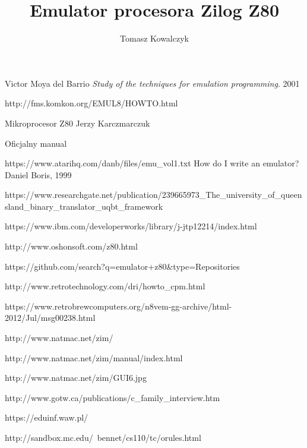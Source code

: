 \documentclass[12pt]{report}
\author{Tomasz Kowalczyk}
\title{Emulator procesora Zilog Z80}
\begin{document}
	\maketitle
	\tableofcontents
	
	
	
	
	
		
		
	
	
	
	
	
	
	
	\begin{thebibliography}{9}
		Victor Moya del Barrio
		\emph{Study of the techniques for emulation programming}.
		2001
		
		http://fms.komkon.org/EMUL8/HOWTO.html
		
		Mikroprocesor Z80 Jerzy Karczmarczuk
		
		Oficjalny manual
		
		 https://www.atarihq.com/danb/files/emu\_vol1.txt
		How do I write an emulator? Daniel Boris, 1999
		
		https://www.researchgate.net/publication/239665973\_The\_university\_of\_queensland\_binary\_translator\_uqbt\_framework
		
		https://www.ibm.com/developerworks/library/j-jtp12214/index.html
		
		http://www.oshonsoft.com/z80.html
		
		https://github.com/search?q=emulator+z80\&type=Repositories
		
		http://www.retrotechnology.com/dri/howto\_cpm.html
		
		https://www.retrobrewcomputers.org/n8vem-gg-archive/html-2012/Jul/msg00238.html

		http://www.natmac.net/zim/
		
		http://www.natmac.net/zim/manual/index.html
		
		http://www.natmac.net/zim/GUI6.jpg
		
		http://www.gotw.ca/publications/c\_family\_interview.htm
		
		https://eduinf.waw.pl/
		
		http://sandbox.mc.edu/~bennet/cs110/tc/orules.html
				
	\end{thebibliography}
	
\end{document}
